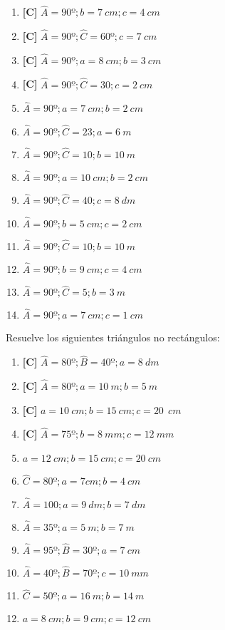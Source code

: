 \begin{enumerate}[topsep=0pt]
	\item \textbf{[C]} $\widehat{A} = 90º; b = 7~cm; c = 4~cm  $
	\item \textbf{[C]} $\widehat{A} = 90º; \widehat{C} = 60º; c = 7~cm  $
	\item \textbf{[C]} $\widehat{A} = 90º; a = 8~cm; b = 3~cm  $
	\item \textbf{[C]} $\widehat{A} = 90º; \widehat{C} = 30; c = 2~cm  $
	
	\item $\widehat{A} = 90º; a = 7~cm; b = 2~cm  $
	\item $\widehat{A} = 90º; \widehat{C} = 23; a = 6~m  $
	\item $\widehat{A} = 90º; \widehat{C} = 10; b = 10~m  $
	\item $\widehat{A} = 90º; a = 10~cm; b = 2~cm  $
	\item $\widehat{A} = 90º; \widehat{C} = 40; c = 8~dm  $
	\item $\widehat{A} = 90º; b = 5~cm; c = 2~cm  $
	\item $\widehat{A} = 90º; \widehat{C} = 10; b = 10~m  $
	\item $\widehat{A} = 90º; b = 9~cm; c = 4~cm  $
	\item $\widehat{A} = 90º; \widehat{C} = 5; b = 3~m  $
	\item $\widehat{A} = 90º; a = 7~cm; c = 1~cm  $

\end{enumerate}


\Exercicio Resuelve los siguientes triángulos no rectángulos:

\begin{enumerate}[topsep=0pt]
	\item \textbf{[C]} $\widehat{A} = 80º; \widehat{B} = 40º; a = 8~dm  $
	\item \textbf{[C]} $\widehat{A} = 80º;  a = 10~m; b = 5~m  $
	\item \textbf{[C]} $a = 10~cm; b = 15~cm; c = 20~~cm  $
	\item \textbf{[C]} $\widehat{A} = 75º; b = 8~mm; c = 12~mm  $

	\item $a=12~cm; b=15~cm; c = 20~cm $
	\item $\widehat{C}=80º; a=7cm; b=4~cm$
	\item $\widehat{A} = 100; a=9~dm; b= 7~dm$
	\item $\widehat{A} = 35º; a=5~m; b=7~m$
	\item $\widehat{A} = 95º; \widehat{B} = 30º; a = 7~cm$
	\item $\widehat{A} = 40º; \widehat{B} = 70º; c = 10~mm$
	\item $\widehat{C} = 50º; a=16~m; b= 14~m$
	\item $a=8~cm; b=9~cm; c= 12~cm$
\end{enumerate}


